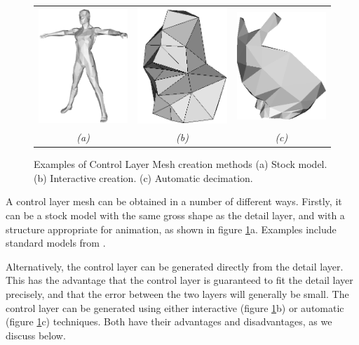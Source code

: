 \begin{figure}
\begin{center}
\begin{tabular}{ccc}
\includegraphics[width=3.5cm]{../images/control_stock} &
\includegraphics[width=3.5cm]{../images/dinohead_control} &
\includegraphics[width=3.5cm]{../images/control_automatic} \\
{\it(a)} & {\it(b)} & {\it(c)}
\end{tabular}
\caption[Control Layer Meshes]{\label{fig:controlmodels} Examples of Control Layer Mesh creation methods (a) Stock model. (b) Interactive creation. (c) Automatic decimation.}
\end{center}
\end{figure}

A control layer mesh can be obtained in a number of different ways. Firstly, it can be a stock model with the same gross shape as the detail layer, and with a structure appropriate for animation, as shown in figure \ref{fig:controlmodels}a. Examples include standard models from \citet{Viewpoint}. 

Alternatively, the control layer can be generated directly from the detail layer. This has the advantage that the control layer is guaranteed to fit the detail layer precisely, and that the error between the two layers will generally be small. The control layer can be generated using either interactive (figure \ref{fig:controlmodels}b) or automatic (figure \ref{fig:controlmodels}c) techniques. Both have their advantages and disadvantages, as we discuss below.

